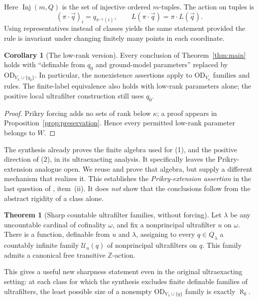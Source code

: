 \documentclass[11pt,letterpaper]{article}
\theoremstyle{definition}
\newtheorem{theorem}[definition]{Theorem}
\newtheorem{corollary}[definition]{Corollary}
\numberwithin{equation}{section}
\newcommand{\OD}{\mathrm{OD}}
\newcommand{\UU}{\mathscr U}
\newcommand{\Inj}{\operatorname{Inj}}
\newcommand{\Z}{\mathbb Z}
\begin{document}
Here $\Inj(m,Q)$ is the set of injective ordered $m$-tuples. The action on tuples is
\[
 (\pi\cdot\vec q)_i=q_{\pi^{-1}(i)},
 \qquad L(\pi\cdot\vec q)=\pi\cdot L(\vec q).
\]
Using representatives instead of classes yields the same statement provided the rule is invariant under changing finitely many points in each coordinate.

\begin{corollary}[The low-rank version]\label{cor:lowrank}
Every conclusion of Theorem~\ref{thm:main} holds with ``definable from $q_0$ and ground-model parameters'' replaced by $\OD_{V_\kappa\cup\{q_0\}}$. In particular, the nonexistence assertions apply to $\OD_{V_\kappa}$ families and rules. The finite-label equivalence also holds with low-rank parameters alone; the positive local ultrafilter construction still uses $q_0$.
\end{corollary}

\begin{proof}
Prikry forcing adds no sets of rank below $\kappa$; a proof appears in Proposition~\ref{prop:preservation}. Hence every permitted low-rank parameter belongs to $W$.
\end{proof}

The synthesis already proves the finite algebra used for (1), and the positive direction of (2), in its ultraexacting analysis. It specifically leaves the Prikry-extension analogue open. We reuse and prove that algebra, but supply a different mechanism that realizes it. This establishes the \emph{Prikry-extension assertion} in the last question of \cite[\S15]{synthesis}, item~(ii). It does \emph{not} show that the conclusions follow from the abstract rigidity of a class alone.

\begin{theorem}[Sharp countable ultrafilter families, without forcing]\label{thm:universalintro}
Let $\lambda$ be any uncountable cardinal of cofinality $\omega$, and fix a nonprincipal ultrafilter $u$ on $\omega$. There is a function, definable from $u$ and $\lambda$, assigning to every $q\in Q_\lambda$ a countably infinite family $\UU_u(q)$ of nonprincipal ultrafilters on $q$. This family admits a canonical free transitive $\Z$-action.
\end{theorem}

This gives a useful new sharpness statement even in the original ultraexacting setting: at each class for which the synthesis excludes finite definable families of ultrafilters, the least possible size of a nonempty $\OD_{V_\lambda\cup\{q\}}$ family is exactly $\aleph_0$.
\end{document}
